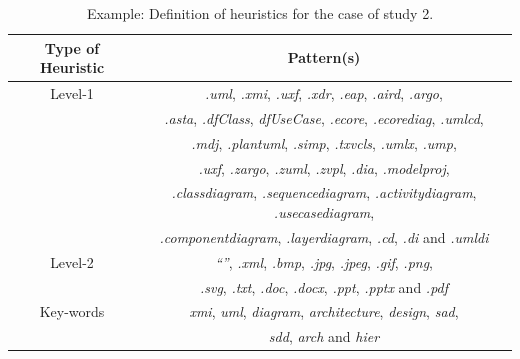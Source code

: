 \documentclass[a4paper, 12pt]{book}
\begin{document}
\begin{table}[]
\centering
\caption{Example: Definition of heuristics for the case of study 2.}
\label{table:heuristics-cs2-example}
\begin{tabular}{|c|c|}
\hline
\textbf{Type of Heuristic} & \textbf{Pattern(s)}                                                                                           \\ \hline
Level-1                    & \textit{.uml}, \textit{.xmi}, \textit{.uxf}, \textit{.xdr}, \textit{.eap}, \textit{.aird}, \textit{.argo},    \\
                           & \textit{.asta}, \textit{.dfClass}, \textit{dfUseCase}, \textit{.ecore}, \textit{.ecorediag}, \textit{.umlcd}, \\
                           & \textit{.mdj}, \textit{.plantuml}, \textit{.simp}, \textit{.txvcls}, \textit{.umlx}, \textit{.ump},           \\
                           & \textit{.uxf}, \textit{.zargo}, \textit{.zuml}, \textit{.zvpl}, \textit{.dia}, \textit{.modelproj},           \\
                           & \textit{.classdiagram}, \textit{.sequencediagram}, \textit{.activitydiagram}, \textit{.usecasediagram},       \\
                           & \textit{.componentdiagram}, \textit{.layerdiagram}, \textit{.cd}, \textit{.di} and \textit{.umldi}            \\ \hline
Level-2                    & \textit{``''}, \textit{.xml}, \textit{.bmp}, \textit{.jpg}, \textit{.jpeg}, \textit{.gif}, \textit{.png},     \\
                           & \textit{.svg}, \textit{.txt}, \textit{.doc}, \textit{.docx}, \textit{.ppt}, \textit{.pptx} and \textit{.pdf}  \\ \hline
Key-words                  & \textit{xmi}, \textit{uml}, \textit{diagram}, \textit{architecture}, \textit{design}, \textit{sad},           \\
                           & \textit{sdd}, \textit{arch} and  \textit{hier}                                                                \\ \hline
\end{tabular}
\end{table}
\cleardoublepage
\end{document}
